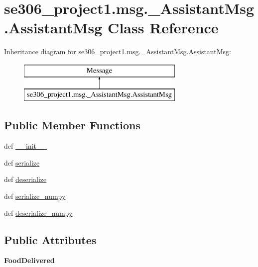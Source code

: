 \hypertarget{classse306__project1_1_1msg_1_1__AssistantMsg_1_1AssistantMsg}{\section{se306\-\_\-project1.\-msg.\-\_\-\-Assistant\-Msg.\-Assistant\-Msg Class Reference}
\label{classse306__project1_1_1msg_1_1__AssistantMsg_1_1AssistantMsg}
}
Inheritance diagram for se306\-\_\-project1.\-msg.\-\_\-\-Assistant\-Msg.\-Assistant\-Msg\-:\begin{figure}[H]
\begin{center}
\leavevmode
\includegraphics[height=2.000000cm]{classse306__project1_1_1msg_1_1__AssistantMsg_1_1AssistantMsg}
\end{center}
\end{figure}
\subsection*{Public Member Functions}
\begin{DoxyCompactItemize}
\item 
def \hyperlink{classse306__project1_1_1msg_1_1__AssistantMsg_1_1AssistantMsg_a301e2c6ab7ed4c48405f23e0992ad767}{\-\_\-\-\_\-init\-\_\-\-\_\-}
\item 
def \hyperlink{classse306__project1_1_1msg_1_1__AssistantMsg_1_1AssistantMsg_a8c4b6d99e72713a71f12f87c18ee2e06}{serialize}
\item 
def \hyperlink{classse306__project1_1_1msg_1_1__AssistantMsg_1_1AssistantMsg_aa8700e1054cba903da6a3e14051c4c04}{deserialize}
\item 
def \hyperlink{classse306__project1_1_1msg_1_1__AssistantMsg_1_1AssistantMsg_a6018ce827cc44ec27b28ef5c65380cfd}{serialize\-\_\-numpy}
\item 
def \hyperlink{classse306__project1_1_1msg_1_1__AssistantMsg_1_1AssistantMsg_a1572c60a75384a707bf4200a39a0a295}{deserialize\-\_\-numpy}
\end{DoxyCompactItemize}
\subsection*{Public Attributes}
\begin{DoxyCompactItemize}
\item 
\hypertarget{classse306__project1_1_1msg_1_1__AssistantMsg_1_1AssistantMsg_adc8b3627502b99e511dad400c3aa4505}{{\bfseries Food\-Delivered}}\label{classse306__project1_1_1msg_1_1__AssistantMsg_1_1AssistantMsg_adc8b3627502b99e511dad400c3aa4505}

\end{DoxyCompactItemize}



